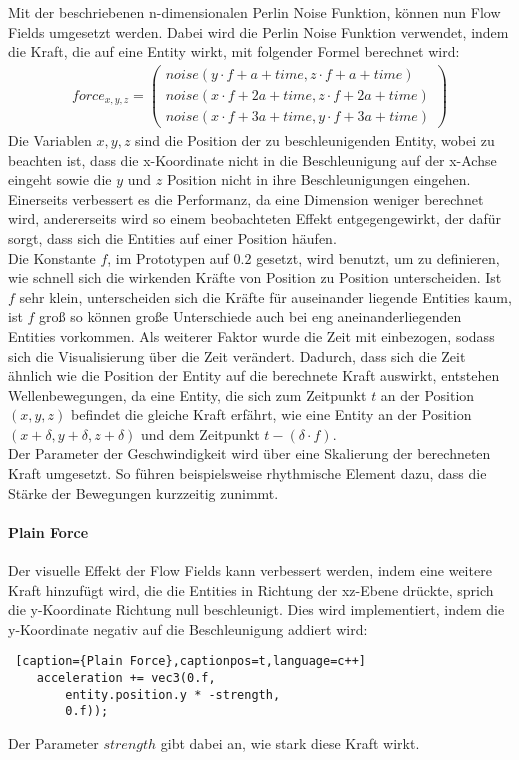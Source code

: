 \documentclass[11pt,a4paper]{article}
\begin{document}
\vspace{10pt}
\noindent
Mit der beschriebenen n-dimensionalen Perlin Noise Funktion, können nun Flow Fields umgesetzt werden. Dabei wird die Perlin Noise Funktion verwendet, indem die Kraft, die auf eine Entity wirkt, mit folgender Formel berechnet wird:
\begin{align}
force_{x,y,z} = \left(
\begin{array}{c}
noise(y \cdot f + a + time, z \cdot f + a + time) \\
noise(x \cdot f + 2a + time, z \cdot f + 2a + time) \\
noise(x \cdot f + 3a + time, y \cdot f + 3a + time)
\end{array}
\right)
\end{align}
\noindent
Die Variablen $x, y, z$ sind die Position der zu beschleunigenden Entity, wobei zu beachten ist, dass die x-Koordinate nicht in die Beschleunigung auf der x-Achse eingeht sowie die $y$ und $z$ Position nicht in ihre Beschleunigungen eingehen. Einerseits verbessert es die Performanz, da eine Dimension weniger berechnet wird, andererseits wird so einem beobachteten Effekt entgegengewirkt, der dafür sorgt, dass sich die Entities auf einer Position häufen.\\
Die Konstante $f$, im Prototypen auf $0.2$ gesetzt, wird benutzt, um zu definieren, wie schnell sich die wirkenden Kräfte von Position zu Position unterscheiden. Ist $f$ sehr klein, unterscheiden sich die Kräfte für auseinander liegende Entities kaum, ist $f$ groß so können große Unterschiede auch bei eng aneinanderliegenden Entities vorkommen. Als weiterer Faktor wurde die Zeit mit einbezogen, sodass sich die Visualisierung über die Zeit verändert. Dadurch, dass sich die Zeit ähnlich wie die Position der Entity auf die berechnete Kraft auswirkt, entstehen Wellenbewegungen, da eine Entity, die sich zum Zeitpunkt $t$ an der Position $(x, y, z)$ befindet die gleiche Kraft erfährt, wie eine Entity an der Position $(x+\delta, y+\delta, z+\delta)$ und dem Zeitpunkt $t-(\delta \cdot f)$.\\
Der Parameter der Geschwindigkeit wird über eine Skalierung der berechneten Kraft umgesetzt. So führen beispielsweise rhythmische Element dazu, dass die Stärke der Bewegungen kurzzeitig zunimmt.

\paragraph{Plain Force}
Der visuelle Effekt der Flow Fields kann verbessert werden, indem eine weitere Kraft hinzufügt wird, die die Entities in Richtung der xz-Ebene drückte, sprich die y-Koordinate Richtung null beschleunigt. Dies wird implementiert, indem die y-Koordinate negativ auf die Beschleunigung addiert wird:
\begin{lstlisting} [caption={Plain Force},captionpos=t,language=c++]
	acceleration += vec3(0.f,
		entity.position.y * -strength,
		0.f));
\end{lstlisting}
\noindent
Der Parameter $strength$ gibt dabei an, wie stark diese Kraft wirkt.\\
\end{document}
